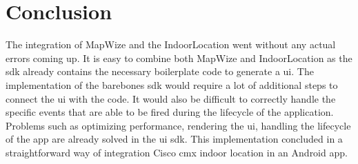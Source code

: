\section{Conclusion}
The integration of MapWize and the IndoorLocation went without any actual errors coming up. It is easy to combine both MapWize and IndoorLocation as the \acrshort{sdk} already contains the necessary boilerplate code to generate a \acrlong{ui}. The implementation of the barebones \acrshort{sdk} would require a lot of additional steps to connect the \acrshort{ui} with the code. It would also be difficult to correctly handle the specific events that are able to be fired during the lifecycle of the application. Problems such as optimizing performance, rendering the \acrshort{ui}, handling the lifecycle of the \acrshort{app} are already solved in the \acrshort{ui} \acrshort{sdk}. This implementation concluded in a straightforward way of integration Cisco \acrshort{cmx} indoor location in an Android \acrshort{app}.